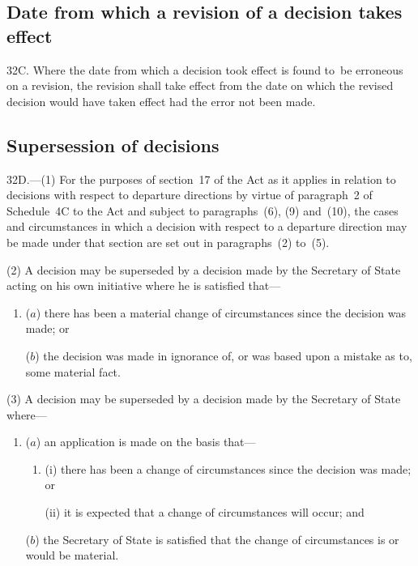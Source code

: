 \documentclass[12pt,a4paper]{article}
\begin{document}
\subsection[32C. Date from which a revision of a decision takes effect]{Date from which a revision of a decision takes effect}

32C.  Where the date from which a decision took effect is found to~be erroneous on a revision, the revision shall take effect from the date on which the revised decision would have taken effect had the error not been made.


\subsection[32D. Supersession of decisions]{Supersession of decisions}

32D.—(1) For the purposes of section~17 of the Act as it applies in relation to decisions with respect to departure directions by virtue of paragraph~2 of Schedule~4C to the Act and subject to paragraphs~(6), (9) and~(10), the cases and circumstances in which a decision with respect to a departure direction may be made under that section are set out in paragraphs~(2) to~(5).

(2) A decision may be superseded by a decision made by the Secretary of State acting on his own initiative where he is satisfied that---
\begin{enumerate}\item[]
($a$) there has been a material change of circumstances since the decision was made; or

($b$) the decision was made in ignorance of, or was based upon a mistake as to, some material fact.
\end{enumerate}

(3) A decision may be superseded by a decision made by the Secretary of State where---
\begin{enumerate}\item[]
($a$) an application is made on the basis that---
\begin{enumerate}\item[]
(i) there has been a change of circumstances since the decision was made; or

(ii) it is expected that a change of circumstances will occur; and
\end{enumerate}

($b$) the Secretary of State is satisfied that the change of circumstances is or would be material.
\end{enumerate}
\end{document}
